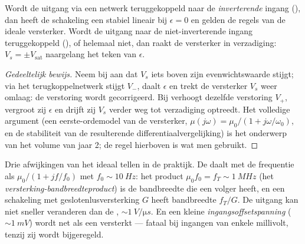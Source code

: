 \begin{proposition}\label{prop:b1:operational-amplifier:feedback}
Wordt de uitgang via een netwerk teruggekoppeld naar de \emph{inverterende}
ingang (), dan heeft de schakeling een stabiel lineair
 bij $\epsilon = 0$ en gelden de regels van de ideale versterker. Wordt de
uitgang naar de niet-inverterende ingang teruggekoppeld (), of
helemaal niet, dan raakt de versterker in verzadiging: $V_s = \pm V_{\mathrm{sat}}$
naargelang het teken van $\epsilon$.
\end{proposition}

\begin{proof}[Gedeeltelijk bewijs]
Neem bij  aan dat $V_s$ iets boven zijn
evenwichtswaarde stijgt; via het terugkoppelnetwerk stijgt $V_-$, daalt $\epsilon$
en trekt de versterker $V_s$ weer omlaag: de verstoring wordt
gecorrigeerd. Bij  verhoogt dezelfde verstoring $V_+$,
vergroot zij $\epsilon$ en drijft zij $V_s$ verder weg tot verzadiging optreedt.
Het volledige argument (een eerste-ordemodel van de versterker, $\mu(j\omega)
= \mu_0/(1 + j\omega/\omega_0)$, en de stabiliteit van de resulterende
differentiaalvergelijking) is het onderwerp van het volume van jaar 2; de regel
hierboven is wat men gebruikt.
\end{proof}

\begin{remark}\label{rem:b1:operational-amplifier:real}
Drie afwijkingen van het ideaal tellen in de praktijk. De 
daalt met de frequentie als $\mu_0/(1 + jf/f_0)$ met $f_0 \sim \qty{10}{Hz}$:
het product $\mu_0 f_0 = f_T \sim \qty{1}{MHz}$ (het
\emph{versterking-bandbreedteproduct}) is de bandbreedte die een volger heeft, en een
schakeling met geslotenlusversterking $G$ heeft bandbreedte $f_T/G$. De uitgang kan niet
sneller veranderen dan de \emph{}, $\sim\qty{1}{V/\micro s}$. En een
kleine \emph{ingangsoffsetspanning} ($\sim\qty{1}{mV}$) wordt net als
een  versterkt --- fataal bij ingangen van enkele millivolt, tenzij zij wordt bijgeregeld.
\end{remark}

